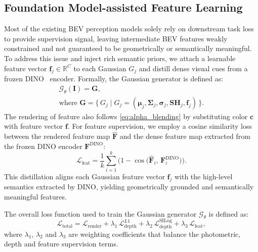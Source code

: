 \subsection{Foundation Model-assisted Feature Learning}
\label{subsec:feature_learning}
Most of the existing BEV perception models solely rely on downstream task loss to provide supervision signal, leaving intermediate BEV features weakly constrained and not guaranteed to be geometrically or semantically meaningful.
To address this issue and inject rich semantic priors, we attach a learnable feature vector $\mathbf{f}_j \in \mathbb{R}^{C}$ to each Gaussian $G_j$ and distill dense visual cues from a frozen DINO~\cite{oquab2024dinov2} encoder.
Formally, the Gaussian generator is defined as:
\begin{equation}
\begin{gathered}
    \mathcal{G}_\theta(\mathbf{I}) = \mathbf{G},\\[2pt]
    \text{where }\mathbf{G} = \{\, G_j \mid G_j = (\boldsymbol{\mu}_j, \boldsymbol{\Sigma}_j, \boldsymbol{\sigma}_j, \mathbf{SH}_j, \mathbf{f}_j) \,\}.
\end{gathered}
\end{equation}
The rendering of feature also follows \cref{eq:alpha_blending} by substituting color $\mathbf{c}$ with feature vector $\mathbf{f}$.
For feature supervision, we employ a cosine similarity loss between the rendered feature map $\widehat{\mathbf{F}}$ 
and the dense feature map extracted from the frozen DINO encoder $\mathbf{F}^{\text{DINO}}$:
\begin{equation}
    \mathcal{L}_{\text{feat}} = 
    \frac{1}{k} \sum_{i=1}^{k} 
    \Big( 1 - 
    \cos\big( 
    \widehat{\mathbf{F}}_i, \,
    \mathbf{F}^{\text{DINO}}_i
    \big) \Big).
\end{equation} 
This distillation aligns each Gaussian feature vector $\mathbf{f}_j$ with the high-level semantics extracted by DINO, yielding geometrically grounded and semantically meaningful features.

The overall loss function used to train the Gaussian generator $\mathcal{G}_\theta$ is defined as:
\begin{equation}
    \mathcal{L}_{\text{total}} = 
    \mathcal{L}_{\text{render}} 
    + \lambda_1 \, \mathcal{L}_{\text{depth}}^{L1} 
    + \lambda_2 \, \mathcal{L}_{\text{depth}}^{\text{SILog}} + \lambda_3 \, \mathcal{L}_{\text{feat}},
    \label{eq:loss_total}
\end{equation}
where $\lambda_1$, $\lambda_2$ and $\lambda_3$ are weighting coefficients that balance the photometric, depth and feature supervision terms. 

